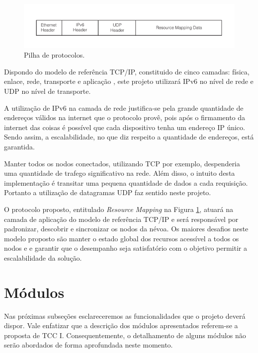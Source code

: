 \begin{figure}[htb!]
    \centering\includegraphics[width=.75\textwidth]{fig2.pdf}
    \caption%
    {\label{fig:fig2} Pilha de protocolos.}
\end{figure}

Dispondo do modelo de referência TCP/IP, constituido de cinco camadas: física, enlace, rede, transporte e aplicação \cite{tanenbaum2011redes}, este projeto utilizará IPv6 no nível de rede e UDP no nível de transporte.

A utilização de IPv6 na camada de rede justifica-se pela grande quantidade de endereços válidos na internet que o protocolo provê, pois após o firmamento da internet das coisas é possível que cada dispositivo tenha um endereço IP único.
Sendo assim, a escalabilidade, no que diz respeito a quantidade de endereços, está garantida.

Manter todos os nodos conectados, utilizando TCP por exemplo, despenderia uma quantidade de trafego significativo na rede. Além disso, o intuito desta implementação é transitar uma pequena quantidade de dados a cada requisição.
Portanto a utilização de datagramas UDP faz sentido neste projeto.

O protocolo proposto, entitulado \textit{Resource Mapping} na Figura \ref{fig:fig2}, atuará na camada de aplicação do modelo de referência TCP/IP \cite{tanenbaum2011redes} e será responsável por padronizar, descobrir e sincronizar os nodos da névoa.
Os maiores desafios neste modelo proposto são manter o estado global dos recursos acessível a todos os nodos e e garantir que o desempanho seja satisfatório com o objetivo permitir a escalabilidade da solução.



\section{Módulos}

Nas próximas subseções esclareceremos as funcionalidades que o projeto deverá dispor.
Vale enfatizar que a descrição dos módulos apresentados referem-se a proposta de TCC I.
Consequentemente, o detalhamento de alguns módulos não serão abordados de forma aprofundada neste momento.


